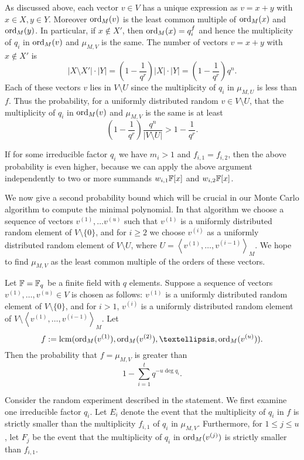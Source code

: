 As discussed above, each vector $v\in V$ has a 
unique expression as $v=x+y$ with $x\in X, y\in Y$. Moreover
$\mathrm{ord}_M(v)$ is the least common multiple of $\mathrm{ord}_M(x)$ and $\mathrm{ord}_M(y)$.
In particular, if $x\not\in X'$, then $\mathrm{ord}_M(x)=q_i^{f}$ and hence
the multiplicity of $q_i$ in $\mathrm{ord}_M(v)$ and $\mu_{M,V}$ is the same.
The number of vectors $v=x+y$ with $x\not\in X'$ is 
\[
|X\setminus X'|\cdot |Y|=(1-\frac{1}{q^r})|X|\cdot|Y|=(1-\frac{1}{q^r})q^n.
\]
Each of these vectors $v$ lies in $V\setminus U$ since the multiplicity of
$q_i$ in $\mu_{M,U}$ is less than $f$. Thus the probability, for
a uniformly distributed random $v\in V\setminus U$, that the multiplicity 
of $q_i$ in $\mathrm{ord}_M(v)$ and $\mu_{M,V}$ is the same is at least
\[
(1-\frac{1}{q^r})\frac{q^n}{|V\setminus U|} > 1-\frac{1}{q^r}.
\]
\proofend

\begin{Rem}
If for some irreducible factor $q_i$ we have $m_i > 1$
and $f_{i,1} = f_{i,2}$, then the above probability is even higher,
because we can apply the above argument independently to two or more summands
$w_{i,1}\mathbb{F}[x]$ and $w_{i,2}\mathbb{F}[x]$.
\end{Rem}


\smallskip
We now give a second probability bound which will be crucial in our
Monte Carlo algorithm to compute the minimal polynomial. In 
that algorithm we choose  a sequence of vectors 
$v^{(1)}, \dots v^{(u)}$ such that $v^{(1)}$ is a uniformly distributed
random element of $V\setminus\{0\}$, and for $i\geq2$ we choose
$v^{(i)}$ as a uniformly distributed random element of 
$V \setminus U$, where $U=\left< v^{(1)}, \ldots, v^{(i-1)} \right>_M$.
We hope to find $\mu_{M,V}$ as the least common multiple of the
orders of these vectors.


\begin{Prop}
\label{ProbAllMult}
Let\/ $\mathbb{F} = \mathbb{F}_q$ be a finite field with $q$ elements.
Suppose a sequence of vectors $v^{(1)}, \ldots, v^{(u)} \in V$ is chosen
as follows: $v^{(1)}$ is a uniformly
distributed random element of $V\setminus\{0\}$, and for $i>1$,
$v^{(i)}$ is a  uniformly distributed random element of  
$V \setminus \left< v^{(1)}, \ldots, v^{(i-1)} \right>_M$. 
Let
\[ 
f := \lcm( \ord_M(v^{(1)}), \ord_M(v^{(2)}), \ldots, 
\ord_M(v^{(u)}) ). 
\]
Then the probability that  $f = \mu_{M,V}$  is greater than
\[ 1-\sum_{i=1}^t q^{-u\deg q_i}. \]
\end{Prop}
\proofbeg
Consider the random experiment described in the statement. We first
examine one irreducible factor $q_i$. Let $E_i$ denote the event
that the multiplicity of $q_i$ in $f$ is strictly smaller than 
the multiplicity $f_{i,1}$ of $q_i$ in $\mu_{M,V}$. Furthermore, for
$1 \le j \le u$, let $F_j$  be the event that the multiplicity of $q_i$ in
$\mathrm{ord}_M(v^{(j)})$ is strictly smaller than $f_{i,1}$. 

